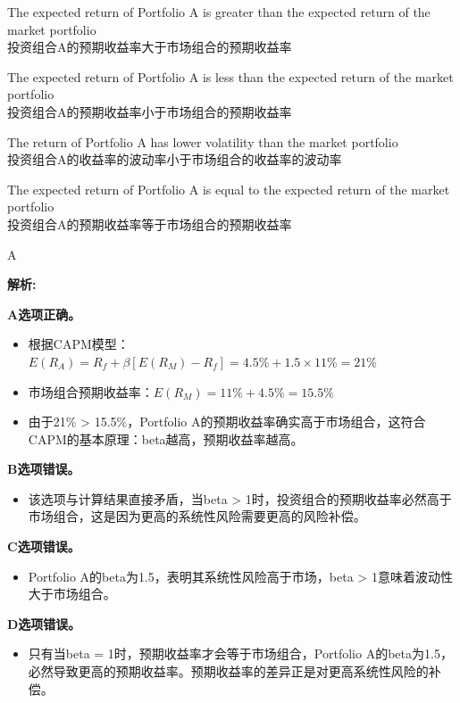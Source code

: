 \documentclass{article}
\newenvironment{explanation}
{\textbf{解析:}\par}
{\par}
\begin{document}
\begin{choices}
    \item The expected return of Portfolio A is greater than the expected return of the market portfolio
    \\
    投资组合A的预期收益率大于市场组合的预期收益率   
    \item The expected return of Portfolio A is less than the expected return of the market portfolio
    \\
    投资组合A的预期收益率小于市场组合的预期收益率
    \item The return of Portfolio A has lower volatility than the market portfolio
    \\
    投资组合A的收益率的波动率小于市场组合的收益率的波动率
    \item The expected return of Portfolio A is equal to the expected return of the market portfolio
    \\
    投资组合A的预期收益率等于市场组合的预期收益率
\end{choices}

\begin{correctanswer}
    A
\end{correctanswer}

\begin{explanation}
    \textbf{A选项正确。}
    \begin{itemize}
        \item 根据CAPM模型：$E(R_A) = R_f + \beta[E(R_M) - R_f] = 4.5\% + 1.5 \times 11\% = 21\%$
        \item 市场组合预期收益率：$E(R_M) = 11\% + 4.5\% = 15.5\%$
        \item 由于21\% > 15.5\%，Portfolio A的预期收益率确实高于市场组合，这符合CAPM的基本原理：beta越高，预期收益率越高。
    \end{itemize}

    \textbf{B选项错误。}
    \begin{itemize}
        \item 该选项与计算结果直接矛盾，当beta > 1时，投资组合的预期收益率必然高于市场组合，这是因为更高的系统性风险需要更高的风险补偿。
    \end{itemize}

    \textbf{C选项错误。}
    \begin{itemize}
        \item Portfolio A的beta为1.5，表明其系统性风险高于市场，beta > 1意味着波动性大于市场组合。
    \end{itemize}

    \textbf{D选项错误。}
    \begin{itemize}
        \item 只有当beta = 1时，预期收益率才会等于市场组合，Portfolio A的beta为1.5，必然导致更高的预期收益率。预期收益率的差异正是对更高系统性风险的补偿。
    \end{itemize}
\end{explanation}
\end{document}
